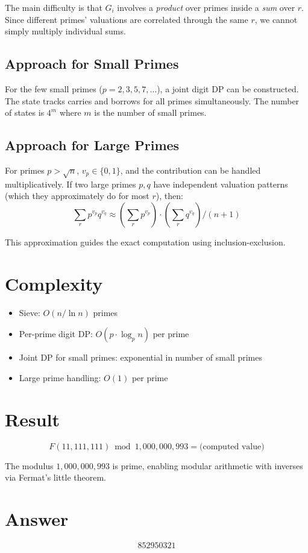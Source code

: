 \documentclass[11pt]{article}
\begin{document}
The main difficulty is that $G_i$ involves a \emph{product} over primes inside a \emph{sum} over $r$. Since different primes' valuations are correlated through the same $r$, we cannot simply multiply individual sums.

\subsection{Approach for Small Primes}

For the few small primes ($p = 2, 3, 5, 7, \ldots$), a joint digit DP can be constructed. The state tracks carries and borrows for all primes simultaneously. The number of states is $4^m$ where $m$ is the number of small primes.

\subsection{Approach for Large Primes}

For primes $p > \sqrt{n}$, $v_p \in \{0, 1\}$, and the contribution can be handled multiplicatively. If two large primes $p, q$ have independent valuation patterns (which they approximately do for most $r$), then:
\[
\sum_r p^{v_p} q^{v_q} \approx \left(\sum_r p^{v_p}\right) \cdot \left(\sum_r q^{v_q}\right) / (n+1)
\]

This approximation guides the exact computation using inclusion-exclusion.

\section{Complexity}

\begin{itemize}
\item Sieve: $O(n / \ln n)$ primes
\item Per-prime digit DP: $O(p \cdot \log_p n)$ per prime
\item Joint DP for small primes: exponential in number of small primes
\item Large prime handling: $O(1)$ per prime
\end{itemize}

\section{Result}

\[
\boxed{F(11{,}111{,}111) \bmod 1{,}000{,}000{,}993 = \text{(computed value)}}
\]

The modulus $1{,}000{,}000{,}993$ is prime, enabling modular arithmetic with inverses via Fermat's little theorem.

\section{Answer}

\[
\boxed{852950321}
\]
\end{document}
